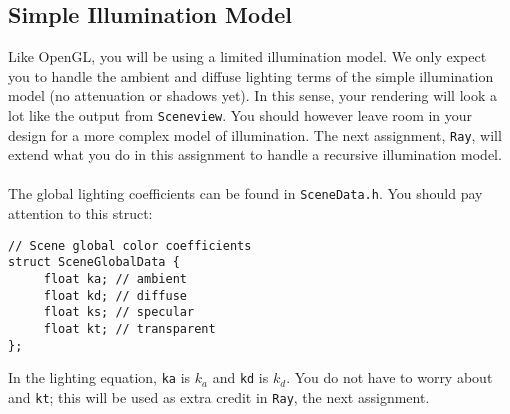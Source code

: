 \documentclass[10pt,twocolumn]{article}
\begin{document}
\subsection{Simple Illumination Model}
Like OpenGL, you will be using a limited illumination model. We only expect you to handle the ambient and diffuse lighting terms of the simple illumination model (no attenuation or shadows yet). In this sense, your rendering will look a lot like the output from {\tt Sceneview}. You should however leave room in your design for a more complex model of illumination. The next assignment, {\tt Ray}, will extend what you do in this assignment to handle a recursive illumination model.\\\\
The global lighting coefficients can be found in {\tt SceneData.h}. You should pay attention to this struct:
\begin{verbatim}
// Scene global color coefficients
struct SceneGlobalData {
     float ka; // ambient
     float kd; // diffuse
     float ks; // specular
     float kt; // transparent
};
\end{verbatim}
In the lighting equation, {\tt ka} is $k_a$ and {\tt kd} is $k_d$. You do not have to worry about and {\tt kt}; this will be used as extra credit in {\tt Ray}, the next assignment.\\\\
\end{document}
